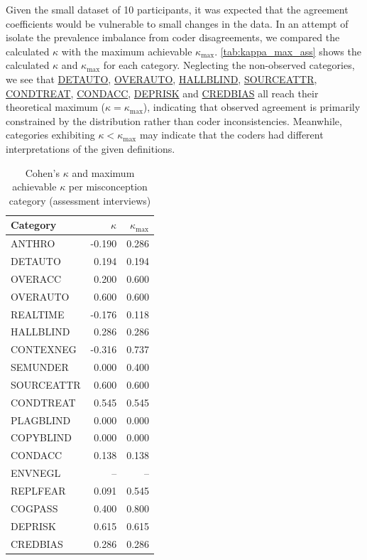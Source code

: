 Given the small dataset of 10 participants, it was expected that the agreement coefficients would be vulnerable to small changes in the data. In an attempt of isolate the prevalence imbalance from coder disagreements, we compared the calculated \(\kappa \) with the maximum achievable \(\kappa_{\max}\). 
\autoref{tab:kappa_max_ass} shows the calculated \(\kappa \) and \(\kappa_{\max}\) for each category. Neglecting the non-observed categories, we see that \hyperref[detauto]{DETAUTO}, \hyperref[overauto]{OVERAUTO}, \hyperref[hallblind]{HALLBLIND}, \hyperref[sourceattr]{SOURCEATTR}, \hyperref[condtreat]{CONDTREAT}, \hyperref[condacc]{CONDACC}, \hyperref[deprisk]{DEPRISK} and \hyperref[credbias]{CREDBIAS} all reach their theoretical maximum (\(\kappa = \kappa_{\max}\)), indicating that observed agreement is primarily constrained by the distribution rather than coder inconsistencies.
Meanwhile, categories exhibiting \(\kappa < \kappa_{\max}\) may indicate that the coders had different interpretations of the given definitions.

\begin{table}
\centering
\caption{Cohen's $\kappa$ and maximum achievable $\kappa$ per misconception category (assessment interviews)}
\begin{tabular}{lrr}
\hline
\textbf{Category} & \textbf{$\kappa$} & \textbf{$\kappa_{\max}$} \\
\hline
ANTHRO      & -0.190 & 0.286 \\
DETAUTO     & 0.194  & 0.194 \\
OVERACC     & 0.200  & 0.600 \\
OVERAUTO    & 0.600  & 0.600 \\
REALTIME    & -0.176 & 0.118 \\
HALLBLIND   & 0.286  & 0.286 \\
CONTEXNEG   & -0.316 & 0.737 \\
SEMUNDER    & 0.000  & 0.400 \\
SOURCEATTR  & 0.600  & 0.600 \\
CONDTREAT   & 0.545  & 0.545 \\
PLAGBLIND   & 0.000  & 0.000 \\
COPYBLIND   & 0.000  & 0.000 \\
CONDACC     & 0.138  & 0.138 \\
ENVNEGL     & --     & -- \\
REPLFEAR    & 0.091  & 0.545 \\
COGPASS     & 0.400  & 0.800 \\
DEPRISK     & 0.615  & 0.615 \\
CREDBIAS    & 0.286  & 0.286 \\
\hline
\end{tabular}
\label{tab:kappa_max_ass}
\end{table}

